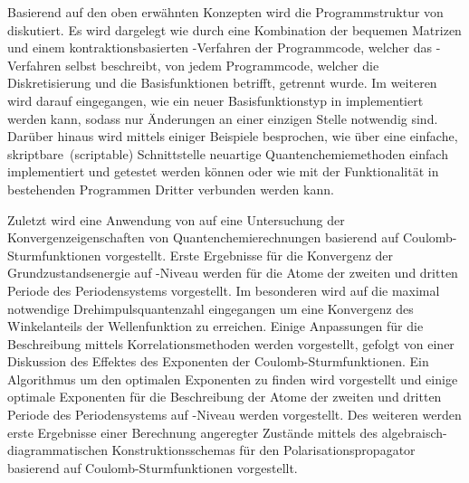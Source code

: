 Basierend auf den oben erwähnten Konzepten wird die Programmstruktur
von \molsturm diskutiert.
Es wird dargelegt wie durch eine Kombination der bequemen Matrizen
und einem kontraktionsbasierten \SCF-Verfahren
der Programmcode,
welcher das \SCF-Verfahren selbst beschreibt,
von jedem Programmcode, welcher die Diskretisierung und die Basisfunktionen
betrifft,
getrennt wurde.
Im weiteren wird darauf eingegangen,
wie ein neuer Basisfunktionstyp
in \molsturm implementiert werden kann,
sodass nur Änderungen an einer einzigen Stelle notwendig sind.
Darüber hinaus wird mittels einiger Beispiele besprochen,
wie über eine einfache, skriptbare~(scriptable) Schnittstelle
neuartige Quantenchemiemethoden
einfach implementiert und getestet werden können
oder wie \molsturm mit der Funktionalität in bestehenden Programmen Dritter
verbunden werden kann.

Zuletzt wird eine Anwendung von \molsturm
auf eine Untersuchung der Konvergenzeigenschaften
von Quantenchemierechnungen basierend auf Coulomb-Sturmfunktionen
vorgestellt.
Erste Ergebnisse für die Konvergenz der Grundzustandsenergie auf \HF-Niveau
werden für die Atome der zweiten und dritten Periode
des Periodensystems vorgestellt.
Im besonderen wird auf die maximal notwendige
Drehimpulsquantenzahl eingegangen
um eine Konvergenz des Winkelanteils der Wellenfunktion
zu erreichen.
Einige Anpassungen
für die Beschreibung mittels Korrelationsmethoden werden vorgestellt,
gefolgt von einer Diskussion des Effektes des Exponenten
der Coulomb-Sturmfunktionen.
Ein Algorithmus um den optimalen Exponenten zu finden
wird vorgestellt und einige optimale Exponenten für die Beschreibung der Atome
der zweiten und dritten Periode des Periodensystems
auf \HF-Niveau werden vorgestellt.
Des weiteren werden erste Ergebnisse einer Berechnung angeregter
Zustände mittels des
algebraisch-diagrammatischen Konstruktionsschemas
für den Polarisationspropagator
basierend auf Coulomb-Sturmfunktionen vorgestellt.
